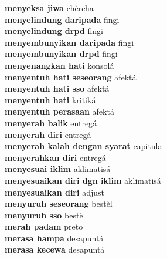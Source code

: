 \textbf{ menyeksa jiwa  } chèrcha \\
\textbf{ menyelindung daripada  } fingi \\
\textbf{ menyelindung drpd  } fingi \\
\textbf{ menyembunyikan daripada  } fingi \\
\textbf{ menyembunyikan drpd  } fingi \\
\textbf{ menyenangkan hati  } konsolá \\
\textbf{ menyentuh hati seseorang  } afektá \\
\textbf{ menyentuh hati sso  } afektá \\
\textbf{ menyentuh hati  } kritiká \\
\textbf{ menyentuh perasaan  } afektá \\
\textbf{ menyerah balik  } entregá \\
\textbf{ menyerah diri  } entregá \\
\textbf{ menyerah kalah dengan syarat  } capitula \\
\textbf{ menyerahkan diri  } entregá \\
\textbf{ menyesuai iklim  } aklimatisá \\
\textbf{ menyesuaikan diri dgn iklim  } aklimatisá \\
\textbf{ menyesuaikan diri  } adjust \\
\textbf{ menyuruh seseorang  } bestèl \\
\textbf{ menyuruh sso  } bestèl \\
\textbf{ merah padam  } preto \\
\textbf{ merasa hampa  } desapuntá \\
\textbf{ merasa kecewa  } desapuntá \\
